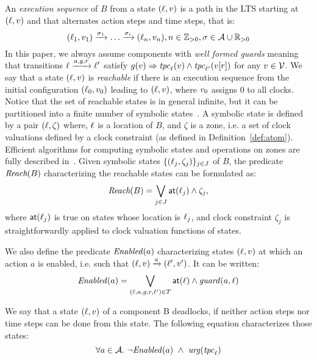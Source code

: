 An \emph{execution sequence} of $B$ from a state $(\ell,v)$ is a path in the LTS starting at $(\ell,v)$ and that 
alternates action steps and time steps, that is:
\begin{displaymath}
  (\ell_1,v_1) \xrightarrow{\sigma_1} \ldots \xrightarrow{\sigma_i} (\ell_n,v_n),n\in\mathbb Z_{> 0},\sigma\in \mathcal{A}\cup\mathbb R_{> 0}
\end{displaymath}
In this paper, we always assume components with \emph{well formed guards} meaning that transitions $\ell \xrightarrow{a,g,r} \ell'$ satisfy
$g(v)\Rightarrow\mathit{tpc}_{\ell}(v)\wedge\mathit{tpc}_{\ell'}(v[r])$ for any $v \in \mathcal{V}$.
We say that a state $(\ell,v)$ is \emph{reachable} if there is an execution sequence from the initial configuration $(\ell_0, v_0)$ leading to 
$(\ell,v)$, where $v_0$ assigns $0$ to all clocks.
Notice that the set of reachable states is in general infinite, but it can be partitioned into a finite number of symbolic
states~\cite{tripakis98:thesis,bengtssonY03,henzinger94}.
A symbolic state is defined by a pair $(\ell,\zeta)$ where, 
$\ell$ is a location of $B$, and $\zeta$ is a zone, i.e. a set of clock valuations defined by a clock constraint (as defined in Definition~\ref{def:atom}).
Efficient algorithms for computing symbolic states and operations on zones are fully described in~\cite{bengtssonY03}.
Given symbolic states $\{ (\ell_j,\zeta_j) \}_{j \in J}$ of $B$, the predicate $\textit{Reach}(B)$ characterizing the reachable states can be formulated as:
\begin{displaymath}
 \textit{Reach}(B) = \bigvee_{j \in J} \textnormal{\textsf{at}}(\ell_j) \wedge \zeta_j, 
\end{displaymath}
where $\textnormal{\textsf{at}}(\ell_j)$ is true on states whose location is $\ell_j$, and clock constraint $\zeta_j$ is straightforwardly applied to clock valuation functions of states.

We also define the predicate $\mathit{Enabled}(a)$ characterizing states $(\ell, v)$ at which an action $a$ is enabled, i.e. such that $(\ell,v) \xrightarrow{a} (\ell',v')$. It can be written:
\begin{displaymath}
\mathit{Enabled}(a) = \bigvee_{(\ell,a,g,r,\ell') \in T} \textnormal{\textsf{at}}(\ell)  \wedge \mathit{guard}(a,\ell)
\end{displaymath}


\begin{definition}[Deadlock]
  \label{def:dl}
  We say that a state $(\ell,v)$ of a component B deadlocks,  
  if neither action steps nor time steps can be done from this state. The following equation characterizes those states:
  \vspace{-1mm}
  \begin{displaymath}
   \forall a\in\A. \ \neg\enabled(a) \ \wedge \ \urg(\tpc{\loc})
  \end{displaymath}
\end{definition}


